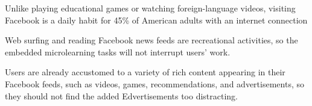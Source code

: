 \documentclass{sigchi}
\begin{document}
\begin{compactitem}
\item Unlike playing educational games or watching foreign-language videos, visiting Facebook is a daily habit for 45\% of American adults with an internet connection \cite{socialmediaupdate} %
\item Web surfing and reading Facebook news feeds are recreational activities, so the embedded microlearning tasks will not interrupt users' work.
\item Users are already accustomed to a variety of rich content appearing in their Facebook feeds, such as videos, games, recommendations, and advertisements, so they should not find the added Edvertisements too distracting.
\end{compactitem}




\end{document}
